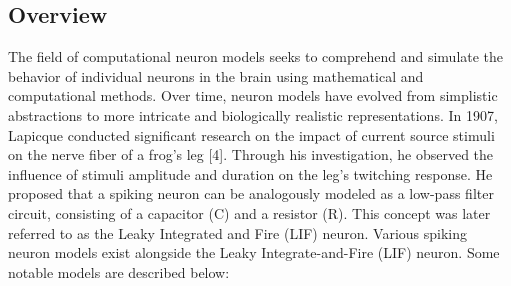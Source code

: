 \subsection{Overview}

The field of computational neuron models seeks to comprehend and simulate the behavior of individual neurons in the brain using mathematical and computational methods. Over time, neuron models have evolved from simplistic abstractions to more intricate and biologically realistic representations. In 1907, Lapicque \cite{abbott1999lapicque} conducted significant research on the impact of current source stimuli on the nerve fiber of a frog's leg [4]. Through his investigation, he observed the influence of stimuli amplitude and duration on the leg's twitching response. He proposed that a spiking neuron can be analogously modeled as a low-pass filter circuit, consisting of a capacitor (C) and a resistor (R). This concept was later referred to as the Leaky Integrated and Fire (LIF) neuron.
Various spiking neuron models exist alongside the Leaky Integrate-and-Fire (LIF) neuron. Some notable models are described below:

